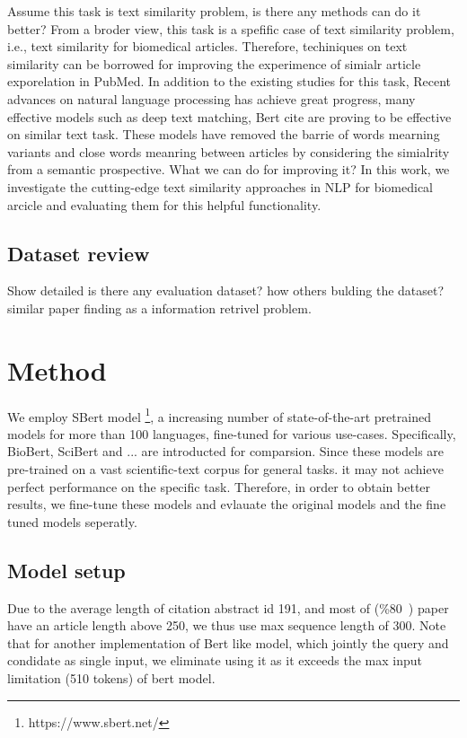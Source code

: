 \documentclass[11pt]{article}
\begin{document}
    Assume this task is text similarity problem, is there any methods can do it better?
    From a broder view, this task is a spefific case of text similarity problem, i.e., text similarity for biomedical articles. Therefore, techiniques on text similarity can be borrowed for improving the experimence of simialr article exporelation in PubMed.
    In addition to the existing studies for this task, Recent advances on natural language processing has achieve great progress, many effective models such as deep text matching, Bert cite are proving to be effective on similar text task.
    These models have removed the barrie of words mearning variants and close words meanring between articles by considering the simialrity from a semantic prospective.
    What we can do for improving it?
    In this work, we investigate the cutting-edge text similarity approaches in NLP for biomedical arcicle and evaluating them for this helpful functionality.

    \subsection{Dataset review}
    Show detailed is there any evaluation dataset?
    how others bulding the dataset?
    similar paper finding as a information retrivel problem.

    \section{Method}
    We employ SBert model \footnote{https://www.sbert.net/}, a increasing number of state-of-the-art pretrained models for more than 100 languages, fine-tuned for various use-cases.
    Specifically, BioBert, SciBert and ... are introducted  for comparsion. Since these models are pre-trained on a vast scientific-text corpus for general tasks. it may not achieve perfect performance on the specific task. Therefore,
    in order to obtain better results, we fine-tune these models and evlauate the original models and the fine tuned models seperatly.

    \subsection{Model setup}
    Due to the average length of citation abstract id 191, and most of (\%80~) paper have an article length above 250, we thus use max sequence length of 300. Note that for another implementation of Bert like model, which jointly the query and condidate as single input,
    we eliminate using it as it exceeds the max input limitation (510 tokens) of bert model.
\end{document}
